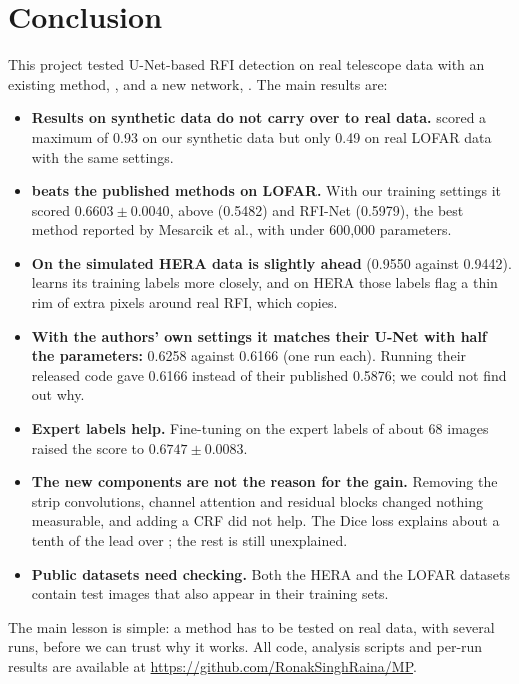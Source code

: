 \chapter{Conclusion}
\label{ch:conclusion}
This project tested U-Net-based RFI detection on real telescope data with an
existing method, \tfunet{}, and a new network, \hybrid{}. The main results are:
\begin{itemize}
  \item \textbf{Results on synthetic data do not carry over to real data.}
    \tfunet{} scored a maximum \Fone{} of 0.93 on our synthetic data but only
    0.49 on real LOFAR data with the same settings.
  \item \textbf{\hybrid{} beats the published methods on LOFAR.} With our
    training settings it scored $0.6603 \pm 0.0040$, above \tfunet{} (0.5482) and
    RFI-Net (0.5979), the best method reported by Mesarcik et al., with under
    600{,}000 parameters.
  \item \textbf{On the simulated HERA data \tfunet{} is slightly ahead}
    (0.9550 against 0.9442). \hybrid{} learns its training labels more closely,
    and on HERA those labels flag a thin rim of extra pixels around real RFI,
    which \hybrid{} copies.
  \item \textbf{With the authors' own settings it matches their U-Net with half
    the parameters:} 0.6258 against 0.6166 (one run each). Running their
    released code gave 0.6166 instead of their published 0.5876; we could not
    find out why.
  \item \textbf{Expert labels help.} Fine-tuning on the expert labels of about
    68 images raised the score to $0.6747 \pm 0.0083$.
  \item \textbf{The new components are not the reason for the gain.} Removing
    the strip convolutions, channel attention and residual blocks changed
    nothing measurable, and adding a CRF did not help. The Dice loss explains
    about a tenth of the lead over \tfunet{}; the rest is still unexplained.
  \item \textbf{Public datasets need checking.} Both the HERA and the LOFAR
    datasets contain test images that also appear in their training sets.
\end{itemize}
The main lesson is simple: a method has to be tested on real data, with
several runs, before we can trust why it works. All code, analysis scripts and per-run results are available at
\url{https://github.com/RonakSinghRaina/MP}.
